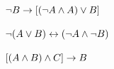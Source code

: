 \begin{compactlist}
\item $\neg B \rightarrow [(\neg A \wedge A) \vee B]$\vspace{.5ex}

%

\item $\neg(A \vee B) \leftrightarrow (\neg A \wedge \neg B)$ \vspace{.5ex}

%

\item $[(A \wedge B) \wedge C] \rightarrow B$\vspace{.5ex}
%
%
%


\end{compactlist}
